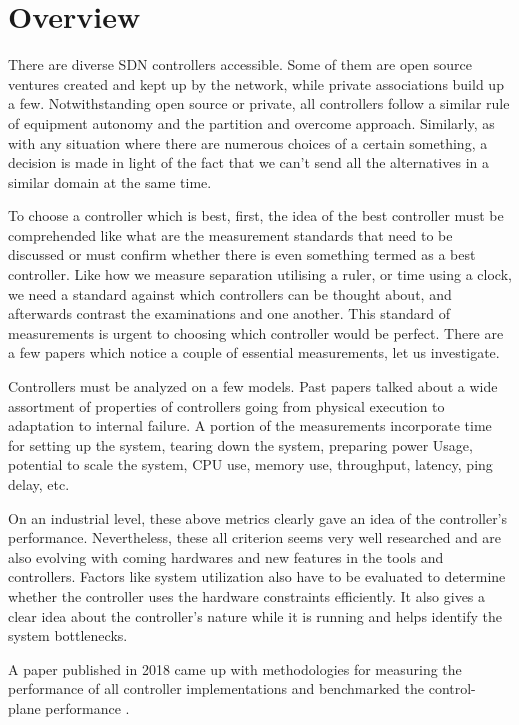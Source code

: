 \chapter{Overview}

    There are diverse SDN controllers accessible. Some of them are open source ventures created and kept up by the network, while private associations build up a few. Notwithstanding open source or private, all controllers follow a similar rule of equipment autonomy and the partition and overcome approach. Similarly, as with any situation where there are numerous choices of a certain something, a decision is made in light of the fact that we can't send all the alternatives in a similar domain at the same time.
 
    To choose a controller which is best, first, the idea of the best controller must be comprehended like what are the measurement standards that need to be discussed or must confirm whether there is even something termed as a best controller. Like how we measure separation utilising a ruler, or time using a clock, we need a standard against which controllers can be thought about, and afterwards contrast the examinations and one another. This standard of measurements is urgent to choosing which controller would be perfect. There are a few papers which notice a couple of essential measurements, let us investigate.
    
   Controllers must be analyzed on a few models. Past papers talked about a wide assortment of properties of controllers going from physical execution to adaptation to internal failure. A portion of the measurements incorporate time for setting up the system, tearing down the system, preparing power Usage, potential to scale the system, CPU use, memory use, throughput, latency, ping delay, etc.
    
     On an industrial level, these above metrics clearly gave an idea of the controller's performance. Nevertheless, these all criterion seems very well researched and are also evolving with coming hardwares and new features in the tools and controllers. Factors like system utilization also have to be evaluated to determine whether the controller uses the hardware constraints efficiently. It also gives a clear idea about the controller's nature while it is running and helps identify the system bottlenecks.
    
    A paper published in 2018 came up with methodologies for measuring the performance of all controller implementations and benchmarked the control- plane performance \cite{rfc8456}.
    
